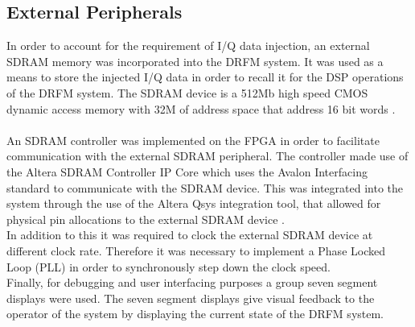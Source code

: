 	\subsection{External Peripherals}
	\noindent In order to account for the requirement of I/Q data injection, an external SDRAM memory was incorporated into the DRFM system. It was used as a means to store the injected I/Q data in order to recall it for the DSP operations of the DRFM system. The SDRAM device is a 512Mb high speed CMOS dynamic access memory with 32M of address space that address 16 bit words \cite{SDRAM}. \\  \\ \newline An SDRAM controller was implemented on the FPGA in order to facilitate communication with the external SDRAM peripheral. The controller made use of the Altera SDRAM Controller IP Core which uses the Avalon Interfacing standard to communicate with the SDRAM device. This was integrated into the system through the use of the Altera Qsys integration tool, that allowed for physical pin allocations to the external SDRAM device \cite{SDRAM_Core}. \\ \newline In addition to this it was required to clock the external SDRAM device at different clock rate. Therefore it was necessary to implement a Phase Locked Loop (PLL) in order to synchronously  step down the clock speed.\\ \newline Finally, for debugging and user interfacing purposes a group seven segment displays were used. The seven segment displays give visual feedback to the operator of the system by displaying the current state of the DRFM system.
